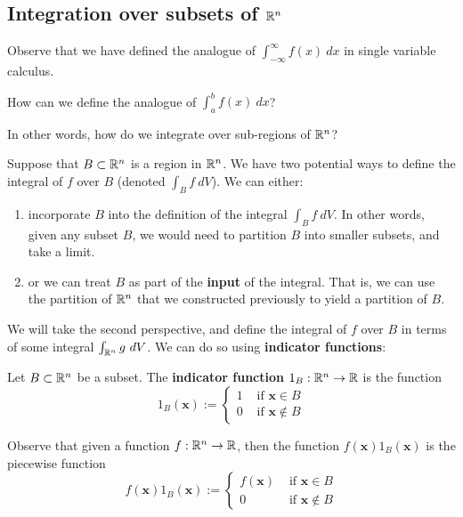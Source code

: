 \subsection{Integration over subsets of $\mathbb{R}^n$}

Observe that we have defined the analogue of $\int_{-\infty}^\infty f(x) \ dx$ in single variable calculus.

    \begin{motivating}
        How can we define the analogue of $\int_a^b f(x) \ dx$?  
    \end{motivating}

    In other words, how do we integrate over sub-regions of $\mathbb{R}^n$?

    Suppose that $B \subset \mathbb{R}^n$ is a region in $\mathbb{R}^n$.  We have two potential ways to define the integral of $f$ over $B$ (denoted $\int_B f \ dV$).  We can either:

    \begin{enumerate}
        \item incorporate $B$ into the definition of the integral $\int_B f \ dV$.        
    In other words, given any subset $B$, we would need to partition $B$ into smaller subsets, and take a limit.
        \item or we can treat $B$ as part of the \textbf{input} of the integral.
        That is, we can use the partition of $\mathbb{R}^n$ that we constructed previously to yield a partition of $B$.
        
    \end{enumerate}

    We will take the second perspective, and define the integral of $f$ over $B$ in terms of some integral $\int_{\R^n} g \ dV$.  We can do so using \textbf{indicator functions}:

    \begin{definition}
    Let $B \subset \mathbb{R}^n$ be a subset.  The \textbf{indicator function} $1_B  :\mathbb{R}^n \to \mathbb{R}$ is the function 
    $$1_B(\bm{x}) := \left\{
		\begin{array}{ll}
			1 & \text{ if } \bm{x} \in B \\
			0 & \text{ if } \bm{x} \notin B
		\end{array}
		\right.$$
    
    \end{definition}

    Observe that given a function $f: \mathbb{R}^n \to \mathbb{R}$, then the function $f(\bm{x})1_B(\bm{x})$ is the piecewise function
    $$f(\bm{x})1_B(\bm{x}) := \left\{
		\begin{array}{ll}
			f(\bm{x}) & \text{ if } \bm{x} \in B \\
			0 & \text{ if } \bm{x} \notin B
		\end{array}
		\right.$$

